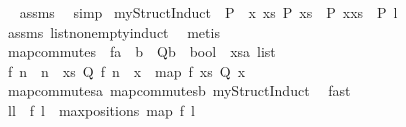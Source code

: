 \begin{isabellebody}
\isadelimproof
\ %
\endisadelimproof
%
\isatagproof
{}\isamarkupfalse%
\ assms\ \isamarkupfalse%
\ simp%
\endisatagproof
{\isafoldproof}%
%
\isadelimproof
%
\endisadelimproof
\isanewline
\isanewline
{}\isamarkupfalse%
\ myStructInduct{\isacharcolon}\ \ {\isachardoublequoteopen}P\ {\isacharbrackleft}{\isacharbrackright}{\isachardoublequoteclose}\ {\isachardoublequoteopen}{\isasymforall}x\ xs{\isachardot}\ P\ {\isacharparenleft}xs{\isacharparenright}\ {\isasymlongrightarrow}\ P\ {\isacharparenleft}x{\isacharhash}xs{\isacharparenright}{\isachardoublequoteclose}\ \ {\isachardoublequoteopen}P\ l{\isachardoublequoteclose}\ \isanewline
%
\isadelimproof
%
\endisadelimproof
%
\isatagproof
{}\isamarkupfalse%
\ assms\ list{\isacharunderscore}nonempty{\isacharunderscore}induct\ \isamarkupfalse%
\ {\isacharparenleft}metis{\isacharparenright}%
\endisatagproof
{\isafoldproof}%
%
\isadelimproof
\isanewline
%
\endisadelimproof
\isanewline
\isanewline
{}\isamarkupfalse%
\ map{\isacharunderscore}commutes{\isacharcolon}\ \ f{\isacharcolon}{\isacharcolon}{\isachardoublequoteopen}{\isacharprime}a\ {\isacharequal}{\isachargreater}\ {\isacharprime}b{\isachardoublequoteclose}\ \ Q{\isacharcolon}{\isacharcolon}{\isachardoublequoteopen}{\isacharprime}b\ {\isacharequal}{\isachargreater}\ bool{\isachardoublequoteclose}\ \ xs{\isacharcolon}{\isacharcolon}{\isachardoublequoteopen}{\isacharprime}a\ list{\isachardoublequoteclose}\ \isanewline
{}\ {\isachardoublequoteopen}{\isacharbrackleft}f\ n\ {\isachardot}\ n\ {\isacharless}{\isacharminus}\ xs{\isacharcomma}\ Q\ {\isacharparenleft}f\ n{\isacharparenright}{\isacharbrackright}\ {\isacharequal}\ {\isacharbrackleft}x\ {\isacharless}{\isacharminus}\ {\isacharparenleft}map\ f\ xs{\isacharparenright}{\isachardot}\ Q\ x{\isacharbrackright}{\isachardoublequoteclose}\isanewline
%
\isadelimproof
%
\endisadelimproof
%
\isatagproof
{}\isamarkupfalse%
\ map{\isacharunderscore}commutes{\isacharunderscore}a\ map{\isacharunderscore}commutes{\isacharunderscore}b\ myStructInduct\ \isamarkupfalse%
\ fast%
\endisatagproof
{\isafoldproof}%
%
\isadelimproof
\isanewline
%
\endisadelimproof
\isanewline
{}\isamarkupfalse%
\ ll{}{\isacharcolon}\ \ f\ l\ \ {\isachardoublequoteopen}maxpositions\ {\isacharparenleft}map\ f\ l{\isacharparenright}\ {\isacharequal}\isanewline

\end{isabellebody}
